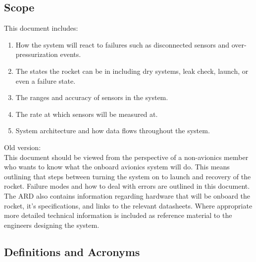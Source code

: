 \documentclass{article}
\begin{document}
\subsection{Scope}
This document includes:
\begin{enumerate}
    \item How the system will react to failures such as disconnected sensors and over-pressurization events. 
    \item The states the rocket can be in including dry systems, leak check, launch, or even a failure state.
    \item The ranges and accuracy of sensors in the system.
    \item The rate at which sensors will be measured at.
    \item System architecture and how data flows throughout the system.
\end{enumerate}


Old version:\\
This document should be viewed from the perspective of a non-avionics member who wants to know what the onboard avionics system will do. This means outlining that steps between turning the system on to launch and recovery of the rocket. Failure modes and how to deal with errors are outlined in this document. The ARD also contains information regarding hardware that will be onboard the rocket, it's specifications, and links to the relevant datasheets. Where appropriate more detailed technical information is included as reference material to the engineers designing the system.

\subsection{Definitions and Acronyms}


\newpage

\pagebreak




\end{document}
